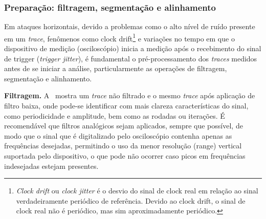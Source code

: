 \documentclass{SBCbookchapter}
\begin{document}
\subsubsection{Preparação: filtragem, segmentação e alinhamento}

Em ataques horizontais, devido a problemas como o alto nível de ruído presente em um \emph{trace}, fenômenos como clock drift\footnote{\emph{Clock drift} ou \emph{clock jitter} é o desvio do sinal de clock real em relação ao sinal verdadeiramente periódico de referência. Devido ao clock drift, o sinal de clock real não é periódico, mas sim aproximadamente periódico.} e variações no tempo em que o dispositivo de medição (osciloscópio) inicia a medição após o recebimento do sinal de trigger (\textit{trigger jitter}), é fundamental o pré-processamento dos \emph{traces} medidos antes de se iniciar a análise, particularmente as operações de filtragem, segmentação e alinhamento.

\noindent \textbf{Filtragem.} A~ mostra um \emph{trace} não filtrado e o mesmo \emph{trace} após aplicação de filtro baixa, onde pode-se identificar com mais clareza características do sinal, como periodicidade e amplitude, bem como as rodadas ou iterações. É recomendável que filtros analógicos sejam aplicados, sempre que possível, de modo que o sinal que é digitalizado pelo osciloscópio contenha apenas as frequências desejadas, permitindo o uso da menor resolução (range) vertical suportada pelo dispositivo, o que pode não ocorrer caso picos em frequências indesejadas estejam presentes.
\end{document}
